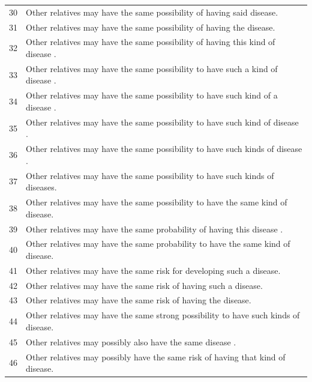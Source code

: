 \documentclass[letterpaper, 11pt]{article}
\begin{document}
\begin{table}[]
\begin{tabular}{ll}
		30                           & Other relatives may have the same possibility of having said disease.                 \\
		31                           & Other relatives may have the same possibility of having the disease.                  \\
		32                           & Other relatives may have the same possibility of having this kind of disease .        \\
		33                           & Other relatives may have the same possibility to have such a kind of disease .        \\
		34                           & Other relatives may have the same possibility to have such kind of a disease .        \\
		35                           & Other relatives may have the same possibility to have such kind of disease .          \\
		36                           & Other relatives may have the same possibility to have such kinds of disease .         \\
		37                           & Other relatives may have the same possibility to have such kinds of diseases.         \\
		38                           & Other relatives may have the same possibility to have the same kind of disease.       \\
		39                           & Other relatives may have the same probability of having this disease .                \\
		40                           & Other relatives may have the same probability to have the same kind of disease.       \\
		41                           & Other relatives may have the same risk for developing such a disease.                 \\
		42                           & Other relatives may have the same risk of having such a disease.                      \\
		43                           & Other relatives may have the same risk of having the disease.                         \\
		44                           & Other relatives may have the same strong possibility to have such kinds of disease.   \\
		45                           & Other relatives may possibly also have the same disease .                             \\
		46                           & Other relatives may possibly have the same risk of having that kind of disease.       \\

\end{tabular}
\end{table}
\end{document}
